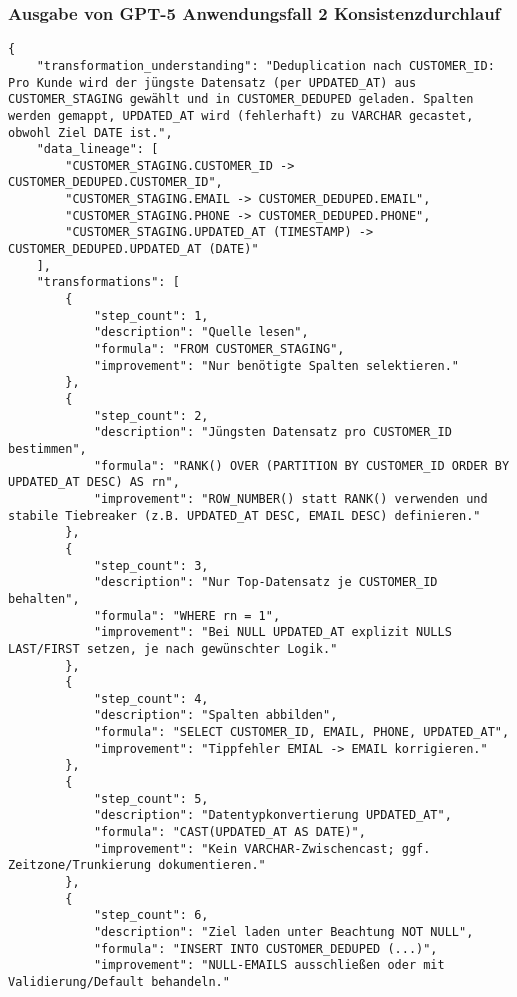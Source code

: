 \subsubsection{Ausgabe von GPT-5 Anwendungsfall 2 Konsistenzdurchlauf}\label{anhang:subsubsec:gpt_case2_prompt2}
\begin{lstlisting}[caption={Ausgabe: GPT-5 Anwendungsfall 2 Konsistenzdurchlauf},label={gpt_case2_prompt2}]
{
    "transformation_understanding": "Deduplication nach CUSTOMER_ID: Pro Kunde wird der jüngste Datensatz (per UPDATED_AT) aus CUSTOMER_STAGING gewählt und in CUSTOMER_DEDUPED geladen. Spalten werden gemappt, UPDATED_AT wird (fehlerhaft) zu VARCHAR gecastet, obwohl Ziel DATE ist.",
    "data_lineage": [
        "CUSTOMER_STAGING.CUSTOMER_ID -> CUSTOMER_DEDUPED.CUSTOMER_ID",
        "CUSTOMER_STAGING.EMAIL -> CUSTOMER_DEDUPED.EMAIL",
        "CUSTOMER_STAGING.PHONE -> CUSTOMER_DEDUPED.PHONE",
        "CUSTOMER_STAGING.UPDATED_AT (TIMESTAMP) -> CUSTOMER_DEDUPED.UPDATED_AT (DATE)"
    ],
    "transformations": [
        {
            "step_count": 1,
            "description": "Quelle lesen",
            "formula": "FROM CUSTOMER_STAGING",
            "improvement": "Nur benötigte Spalten selektieren."
        },
        {
            "step_count": 2,
            "description": "Jüngsten Datensatz pro CUSTOMER_ID bestimmen",
            "formula": "RANK() OVER (PARTITION BY CUSTOMER_ID ORDER BY UPDATED_AT DESC) AS rn",
            "improvement": "ROW_NUMBER() statt RANK() verwenden und stabile Tiebreaker (z.B. UPDATED_AT DESC, EMAIL DESC) definieren."
        },
        {
            "step_count": 3,
            "description": "Nur Top-Datensatz je CUSTOMER_ID behalten",
            "formula": "WHERE rn = 1",
            "improvement": "Bei NULL UPDATED_AT explizit NULLS LAST/FIRST setzen, je nach gewünschter Logik."
        },
        {
            "step_count": 4,
            "description": "Spalten abbilden",
            "formula": "SELECT CUSTOMER_ID, EMAIL, PHONE, UPDATED_AT",
            "improvement": "Tippfehler EMIAL -> EMAIL korrigieren."
        },
        {
            "step_count": 5,
            "description": "Datentypkonvertierung UPDATED_AT",
            "formula": "CAST(UPDATED_AT AS DATE)",
            "improvement": "Kein VARCHAR-Zwischencast; ggf. Zeitzone/Trunkierung dokumentieren."
        },
        {
            "step_count": 6,
            "description": "Ziel laden unter Beachtung NOT NULL",
            "formula": "INSERT INTO CUSTOMER_DEDUPED (...)",
            "improvement": "NULL-EMAILS ausschließen oder mit Validierung/Default behandeln."

\end{lstlisting}
